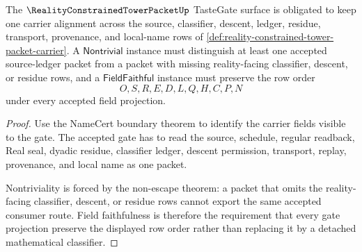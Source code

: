 \begin{theorem}
\label{thm:reality-constrained-tower-packet-tastegate-obligation}
The $\RealityConstrainedTowerPacketUp$ TasteGate surface is obligated to keep one carrier alignment across the source, classifier, descent, ledger, residue, transport, provenance, and local-name rows of \autoref{def:reality-constrained-tower-packet-carrier}. A $\mathsf{Nontrivial}$ instance must distinguish at least one accepted source-ledger packet from a packet with missing reality-facing classifier, descent, or residue rows, and a $\mathsf{FieldFaithful}$ instance must preserve the row order
$$
O,S,R,E,D,L,Q,H,C,P,N
$$
under every accepted field projection.
\end{theorem}
\begin{proof}
Use the NameCert boundary theorem to identify the carrier fields visible to the gate. The accepted gate has to read the source, schedule, regular readback, Real seal, dyadic residue, classifier ledger, descent permission, transport, replay, provenance, and local name as one packet.

Nontriviality is forced by the non-escape theorem: a packet that omits the reality-facing classifier, descent, or residue rows cannot export the same accepted consumer route. Field faithfulness is therefore the requirement that every gate projection preserve the displayed row order rather than replacing it by a detached mathematical classifier.
\end{proof}

